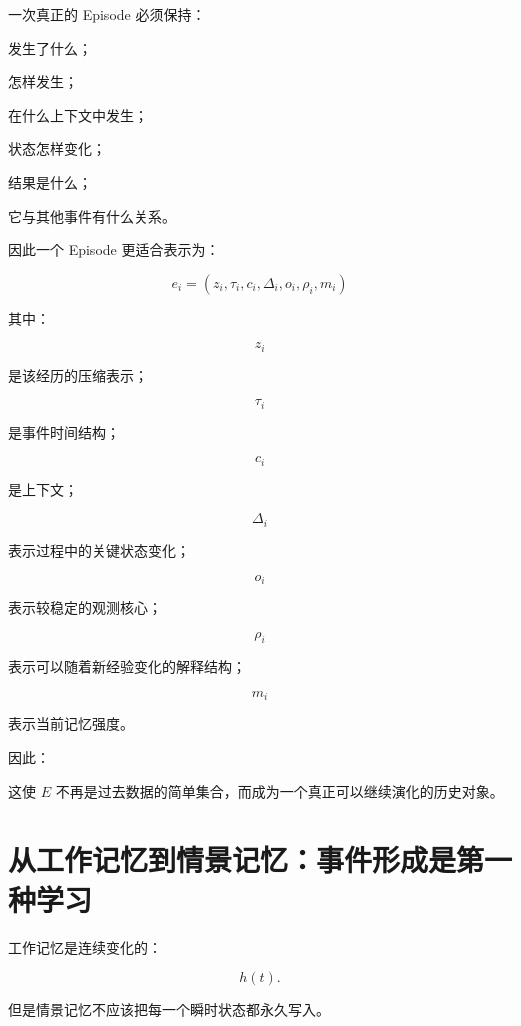 \begin{statementbox}
\centering
{}
\end{statementbox}

一次真正的 Episode 必须保持：

发生了什么；

怎样发生；

在什么上下文中发生；

状态怎样变化；

结果是什么；

它与其他事件有什么关系。

因此一个 Episode 更适合表示为：

\[
\boxed{
e_i
=
(
z_i,
\tau_i,
c_i,
\Delta_i,
o_i,
\rho_i,
m_i
)
}
\]

其中：

\[
z_i
\]

是该经历的压缩表示；

\[
\tau_i
\]

是事件时间结构；

\[
c_i
\]

是上下文；

\[
\Delta_i
\]

表示过程中的关键状态变化；

\[
o_i
\]

表示较稳定的观测核心；

\[
\rho_i
\]

表示可以随着新经验变化的解释结构；

\[
m_i
\]

表示当前记忆强度。

因此：

\begin{statementbox}
\centering
{}
\end{statementbox}

这使 \(E\) 不再是过去数据的简单集合，而成为一个真正可以继续演化的历史对象。


\section{从工作记忆到情景记忆：事件形成是第一种学习}

工作记忆是连续变化的：

\[
h(t).
\]

但是情景记忆不应该把每一个瞬时状态都永久写入。

